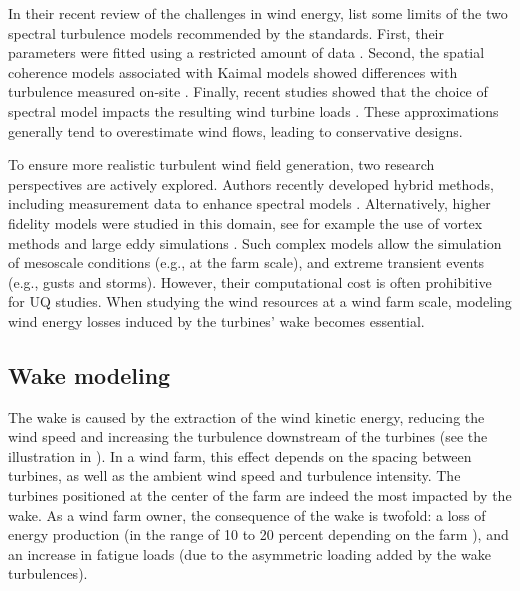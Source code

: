 In their recent review of the challenges in wind energy, \citet{veers_2019_review} list some limits of the two spectral turbulence models recommended by the standards. 
First, their parameters were fitted using a restricted amount of data \citep{dimitrov_2017_turbulence_models_on_loads}. 
Second, the spatial coherence models associated with Kaimal models showed differences with turbulence measured on-site \citep{saranyasoontorn_2004}.  
Finally, recent studies showed that the choice of spectral model impacts the resulting wind turbine loads \citep{doubrawa_2019}. 
These approximations generally tend to overestimate wind flows, leading to conservative designs. 

To ensure more realistic turbulent wind field generation, two research perspectives are actively explored. 
Authors recently developed hybrid methods, including measurement data to enhance spectral models \citep{dimitrov_2017_constrained_turbulence}. 
Alternatively, higher fidelity models were studied in this domain, see for example the use of vortex methods \citep{branlard_2017_book} and large eddy simulations \citep{doubrawa_2019,bui_2022_mesoscale_LES}.  
Such complex models allow the simulation of mesoscale conditions (e.g., at the farm scale), and extreme transient events (e.g., gusts and storms). 
However, their computational cost is often prohibitive for UQ studies. 
When studying the wind resources at a wind farm scale, modeling wind energy losses induced by the turbines' wake becomes essential. 



\subsection{Wake modeling}\label{sec:222}

The wake is caused by the extraction of the wind kinetic energy, reducing the wind speed and increasing the turbulence downstream of the turbines (see the illustration in ). 
In a wind farm, this effect depends on the spacing between turbines, as well as the ambient wind speed and turbulence intensity. 
The turbines positioned at the center of the farm are indeed the most impacted by the wake. 
As a wind farm owner, the consequence of the wake is twofold: a loss of energy production (in the range of 10 to 20 percent depending on the farm \citealp[Chap. 9]{burton_2021_wind_handbook}), and an increase in fatigue loads (due to the asymmetric loading added by the wake turbulences).

